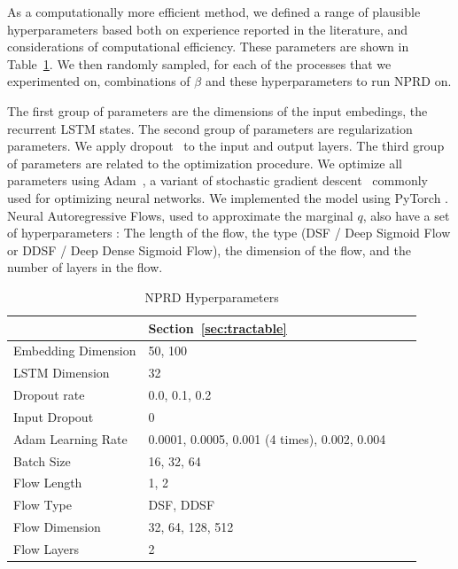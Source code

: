\documentclass[11pt,letterpaper]{article}
\begin{document}
As a computationally more efficient method, we defined a range of plausible hyperparameters based both on experience reported in the literature, and considerations of computational efficiency.
These parameters are shown in Table~\ref{tab:nprd-hyperparameters}.
We then randomly sampled, for each of the processes that we experimented on, combinations of $\beta$ and these hyperparameters to run NPRD on.

The first group of parameters are the dimensions of the input embedings, the recurrent LSTM states.
The second group of parameters are regularization parameters.
We apply dropout~\citep{srivastava-dropout:-2014} to the input and output layers.
The third group of parameters are related to the optimization procedure.
We optimize all parameters using Adam~\citep{kingma-adam:-2014}, a variant of stochastic gradient descent~\citep{robbins1951stochastic} commonly used for optimizing neural networks.
We implemented the model using PyTorch \citep{paszke2017automatic}.
Neural Autoregressive Flows, used to approximate the marginal $q$, also have a set of hyperparameters \citep{huang-neural-2018}: The length of the flow, the type (DSF / Deep Sigmoid Flow or  DDSF / Deep Dense Sigmoid Flow), the dimension of the flow, and the number of layers in the flow.


\begin{table}
\begin{tabular}{l||lll}
	            & Section~\ref{sec:tractable} \\ \hline\hline
	Embedding Dimension & 50, 100 \\
	LSTM Dimension & 32 \\ \hline
	Dropout rate & 0.0, 0.1, 0.2 \\
	Input Dropout & 0 \\ \hline
	Adam Learning Rate & 0.0001, 0.0005, 0.001 (4 times), 0.002, 0.004 \\
	Batch Size & 16, 32, 64 \\ \hline
	Flow Length & 1, 2 \\
	Flow Type & DSF, DDSF \\
	Flow Dimension & 32, 64, 128, 512 \\
	Flow Layers & 2 \\
\end{tabular}
	\caption{NPRD Hyperparameters}\label{tab:nprd-hyperparameters}
\end{table}
\end{document}
